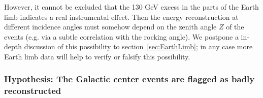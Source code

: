 \documentclass[aps,twocolumn,prd,superscriptaddress,showpacs,nofootinbib,fixfloat]{revtex4}
\begin{document}
However, it cannot be excluded that the 130 GeV excess in
the parts of the Earth limb indicates a real instrumental
effect. Then the energy
reconstruction at different incidence angles must somehow
depend on the zenith angle $Z$ of the events (e.g. via a
subtle correlation with the rocking angle).%
We postpone a in-depth discussion of this possibility to
section~\ref{sec:EarthLimb}; in any case more
Earth limb data will help to verify or falsify this possibility.

\subsubsection{Hypothesis: The Galactic center events are flagged as badly
reconstructed}
\end{document}
